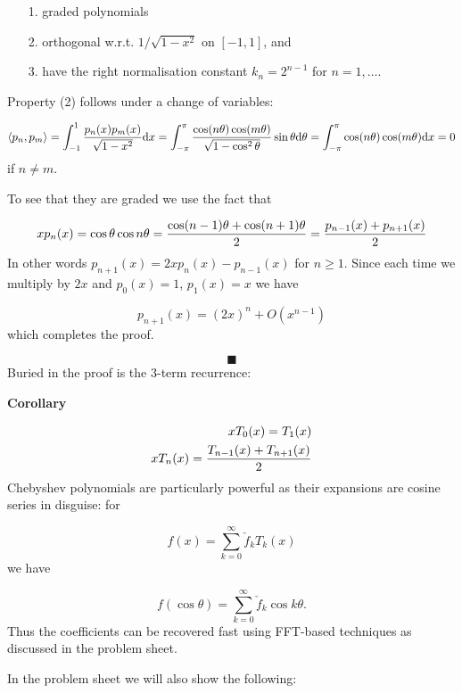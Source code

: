 \documentclass[12pt,a4paper]{article}
\begin{document}
\begin{itemize}
\item[1. ] graded polynomials


\item[2. ] orthogonal w.r.t. $1/\sqrt{1-x^2}$ on $[-1,1]$, and


\item[3. ] have the right normalisation constant $k_n = 2^{n-1}$ for $n = 1,\ensuremath{\ldots}$.

\end{itemize}
Property (2) follows under a change of variables:

\[
\langle p_n, p_m \rangle = \int_{-1}^1 {p_n(x) p_m(x) \over \sqrt{1-x^2}} {\rm d} x =
\int_{-\ensuremath{\pi}}^\ensuremath{\pi} {\cos(n\ensuremath{\theta}) \cos(m\ensuremath{\theta}) \over \sqrt{1-\cos^2 \ensuremath{\theta}}} \sin \ensuremath{\theta} {\rm d} \ensuremath{\theta} =
\int_{-\ensuremath{\pi}}^\ensuremath{\pi} \cos(n\ensuremath{\theta}) \cos(m\ensuremath{\theta}) {\rm d} x = 0
\]
if $n \ensuremath{\ne} m$.

To see that they are graded we use the fact that

\[
x p_n(x) = \cos \ensuremath{\theta} \cos n \ensuremath{\theta} = {\cos(n-1)\ensuremath{\theta} + \cos(n+1)\ensuremath{\theta} \over 2} = {p_{n-1}(x) + p_{n+1}(x) \over 2}
\]
In other words $p_{n+1}(x) = 2x p_n(x) - p_{n-1}(x)$ for $n \geq 1$. Since each time we multiply by $2x$ and $p_0(x) = 1$, $p_1(x)=x$ we have

\[
p_{n+1}(x) = (2x)^n + O(x^{n-1})
\]
which completes the proof.

\[
\blacksquare
\]
Buried in the proof is the 3-term recurrence:

\textbf{Corollary}


\begin{align*}
x T_0(x) = T_1(x) \\
x T_n(x) = {T_{n-1}(x) + T_{n+1}(x) \over 2}
\end{align*}
Chebyshev polynomials are particularly powerful as their expansions are cosine series in disguise: for

\[
f(x) = \ensuremath{\sum}_{k=0}^\ensuremath{\infty} \check{f}_k T_k(x)
\]
we have

\[
f(\cos \ensuremath{\theta}) = \ensuremath{\sum}_{k=0}^\ensuremath{\infty} \check{f}_k \cos k \ensuremath{\theta}.
\]
Thus the coefficients can be recovered fast using FFT-based techniques as discussed in the problem sheet.

In the problem sheet we will also show the following:
\end{document}
